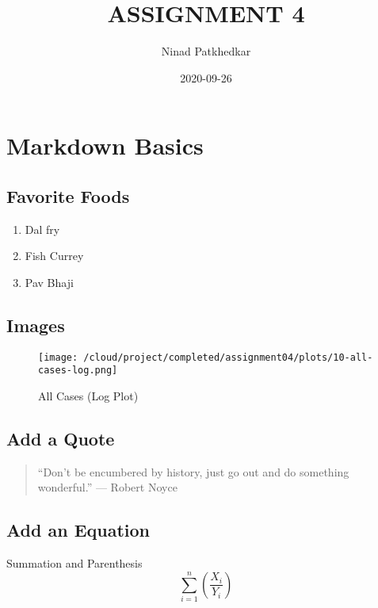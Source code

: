 \documentclass[
]{article}
\title{ASSIGNMENT 4}
\author{Ninad Patkhedkar}
\date{2020-09-26}
\providecommand{\tightlist}{%
  \setlength{\itemsep}{0pt}\setlength{\parskip}{0pt}}
\begin{document}
\maketitle

\hypertarget{markdown-basics}{%
\section{Markdown Basics}\label{markdown-basics}}

\hypertarget{favorite-foods}{%
\subsection{Favorite Foods}\label{favorite-foods}}

\begin{enumerate}
\def\labelenumi{\arabic{enumi}.}
\tightlist
\item
  Dal fry
\item
  Fish Currey
\item
  Pav Bhaji
\end{enumerate}

\hypertarget{images}{%
\subsection{Images}\label{images}}

\begin{figure}
\centering
\texttt{[image: /cloud/project/completed/assignment04/plots/10-all-cases-log.png]}
\caption{All Cases (Log Plot)}
\end{figure}

\hypertarget{add-a-quote}{%
\subsection{Add a Quote}\label{add-a-quote}}

\begin{quote}
``Don't be encumbered by history, just go out and do something
wonderful.'' --- Robert Noyce
\end{quote}

\hypertarget{add-an-equation}{%
\subsection{Add an Equation}\label{add-an-equation}}

Summation and Parenthesis
\[\sum_{i=1}^{n}\left( \frac{X_i}{Y_i} \right)\]
\end{document}
